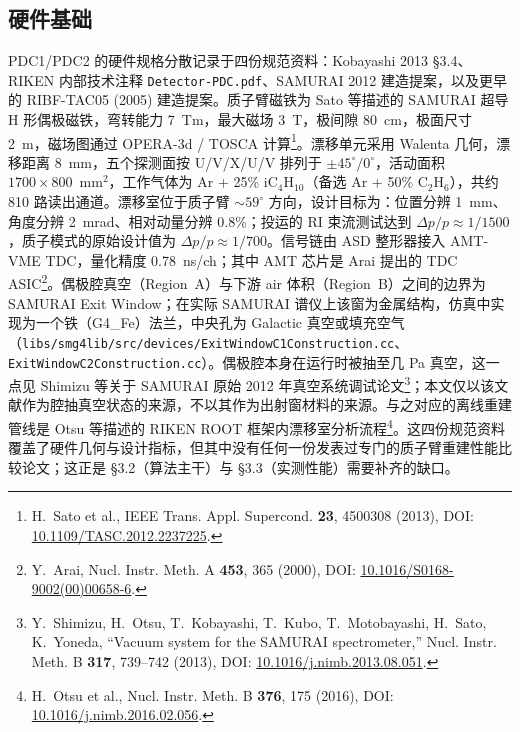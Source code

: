 \documentclass[a4paper, 11pt]{article}
\begin{document}
\subsection{硬件基础}
PDC1/PDC2 的硬件规格分散记录于四份规范资料：Kobayashi 2013 §3.4、RIKEN 内部技术注释 \texttt{Detector-PDC.pdf}、SAMURAI 2012 建造提案，以及更早的 RIBF-TAC05 (2005) 建造提案。质子臂磁铁为 Sato 等描述的 SAMURAI 超导 H 形偶极磁铁，弯转能力 7~Tm，最大磁场 3~T，极间隙 80~cm，极面尺寸 2~m，磁场图通过 OPERA-3d / TOSCA 计算\footnote{\label{fn:sato2013}H.~Sato et al., IEEE Trans. Appl. Supercond. \textbf{23}, 4500308 (2013), DOI: \href{https://doi.org/10.1109/TASC.2012.2237225}{10.1109/TASC.2012.2237225}.}。漂移单元采用 Walenta 几何，漂移距离 8~mm，五个探测面按 U/V/X/U/V 排列于 $\pm 45^\circ/0^\circ$，活动面积 $1700 \times 800$~mm$^2$，工作气体为 Ar + 25\% iC$_4$H$_{10}$（备选 Ar + 50\% C$_2$H$_6$），共约 810 路读出通道。漂移室位于质子臂 $\sim 59^\circ$ 方向，设计目标为：位置分辨 1~mm、角度分辨 2~mrad、相对动量分辨 0.8\%；投运的 RI 束流测试达到 $\Delta p/p \approx 1/1500$，质子模式的原始设计值为 $\Delta p/p \approx 1/700$。信号链由 ASD 整形器接入 AMT-VME TDC，量化精度 0.78~ns/ch；其中 AMT 芯片是 Arai 提出的 TDC ASIC\footnote{\label{fn:arai2000}Y.~Arai, Nucl. Instr. Meth. A \textbf{453}, 365 (2000), DOI: \href{https://doi.org/10.1016/S0168-9002(00)00658-6}{10.1016/S0168-9002(00)00658-6}.}。偶极腔真空（Region~A）与下游 air 体积（Region~B）之间的边界为 SAMURAI Exit Window；在实际 SAMURAI 谱仪上该窗为金属结构，仿真中实现为一个铁（G4\_Fe）法兰，中央孔为 Galactic 真空或填充空气（\texttt{libs/smg4lib/src/devices/ExitWindowC1Construction.cc}、\texttt{ExitWindowC2Construction.cc}）。偶极腔本身在运行时被抽至几 Pa 真空，这一点见 Shimizu 等关于 SAMURAI 原始 2012 年真空系统调试论文\footnote{\label{fn:shimizu2013}Y.~Shimizu, H.~Otsu, T.~Kobayashi, T.~Kubo, T.~Motobayashi, H.~Sato, K.~Yoneda, ``Vacuum system for the SAMURAI spectrometer,'' Nucl. Instr. Meth. B \textbf{317}, 739--742 (2013), DOI: \href{https://doi.org/10.1016/j.nimb.2013.08.051}{10.1016/j.nimb.2013.08.051}.}；本文仅以该文献作为腔抽真空状态的来源，不以其作为出射窗材料的来源。与之对应的离线重建管线是 Otsu 等描述的 RIKEN ROOT 框架内漂移室分析流程\footnote{\label{fn:otsu2016}H.~Otsu et al., Nucl. Instr. Meth. B \textbf{376}, 175 (2016), DOI: \href{https://doi.org/10.1016/j.nimb.2016.02.056}{10.1016/j.nimb.2016.02.056}.}。这四份规范资料覆盖了硬件几何与设计指标，但其中没有任何一份发表过专门的质子臂重建性能比较论文；这正是 §3.2（算法主干）与 §3.3（实测性能）需要补齐的缺口。
\end{document}

